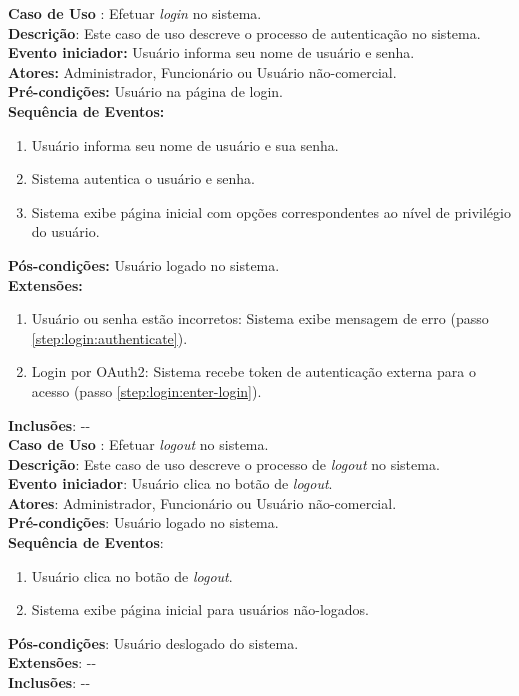 \documentclass[]{politex}
\begin{document}
\noindent \textbf{Caso de Uso }: Efetuar \textit{login} no
sistema. \\
\textbf{Descrição}: Este caso de uso descreve o processo de autenticação no
sistema. \\
\textbf{Evento iniciador:} Usuário informa seu nome de usuário e senha. \\
\textbf{Atores:} Administrador, Funcionário ou Usuário não-comercial. \\
\textbf{Pré-condições:} Usuário na página de login. \\
\textbf{Sequência de Eventos:}
\begin{enumerate}
\item\label{step:login:enter-login} Usuário informa seu nome de usuário e sua
senha.
\item\label{step:login:authenticate} Sistema autentica o usuário e senha.
\item Sistema exibe página inicial com opções correspondentes ao nível de
privilégio do usuário.
\end{enumerate}
\textbf{Pós-condições:} Usuário logado no sistema. \\
\textbf{Extensões:}
\begin{enumerate}
\item Usuário ou senha estão incorretos: Sistema exibe mensagem de erro (passo
\ref{step:login:authenticate}).
\item Login por OAuth2: Sistema recebe token de autenticação externa para o
acesso (passo \ref{step:login:enter-login}).
\end{enumerate}
\textbf{Inclusões}: -{}- \\

\noindent \textbf{Caso de Uso }: Efetuar \textit{logout} no
sistema. \\
\textbf{Descrição}: Este caso de uso descreve o processo de \textit{logout} no
sistema. \\
\textbf{Evento iniciador}: Usuário clica no botão de \textit{logout}. \\
\textbf{Atores}: Administrador, Funcionário ou Usuário não-comercial. \\
\textbf{Pré-condições}: Usuário logado no sistema. \\
\textbf{Sequência de Eventos}:
\begin{enumerate}
\item Usuário clica no botão de \textit{logout}.
\item Sistema exibe página inicial para usuários não-logados.
\end{enumerate}
\textbf{Pós-condições}: Usuário deslogado do sistema. \\
\textbf{Extensões}: -{}- \\
\textbf{Inclusões}: -{}- \\
\end{document}
